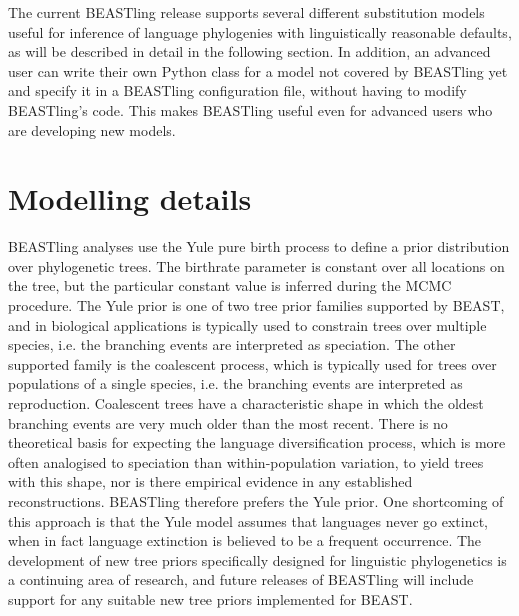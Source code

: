 \documentclass[10pt,a4paper]{article}
\begin{document}
The current BEASTling release supports several different substitution models useful for inference of language phylogenies with linguistically reasonable defaults, as will be described in detail in the following section. In addition, an advanced user can write their own Python class for a model not covered by BEASTling yet and specify it in a BEASTling configuration file, without having to modify BEASTling's code.  This makes BEASTling useful even for advanced users who are developing new models.

\section{Modelling details}

BEASTling analyses use the Yule pure birth process\cite{Yule1924} to define a prior distribution over phylogenetic trees.  The birthrate parameter is constant over all locations on the tree, but the particular constant value is inferred during the MCMC procedure.  The Yule prior is one of two tree prior families supported by BEAST, and in biological applications is typically used to constrain trees over multiple species, i.e. the branching events are interpreted as speciation.  The other supported family is the coalescent process\cite{Kingman1982}, which is typically used for trees over populations of a single species, i.e. the branching events are interpreted as reproduction.  Coalescent trees have a characteristic shape in which the oldest branching events are very much older than the most recent.  There is no theoretical basis for expecting the language diversification process, which is more often analogised to speciation than within-population variation, to yield trees with this shape, nor is there empirical evidence in any established reconstructions.  BEASTling therefore prefers the Yule prior.  One shortcoming of this approach is that the Yule model assumes that languages never go extinct, when in fact language extinction is believed to be a frequent occurrence.  The development of new tree priors specifically designed for linguistic phylogenetics is a continuing area of research, and future releases of BEASTling will include support for any suitable new tree priors implemented for BEAST.
\end{document}
